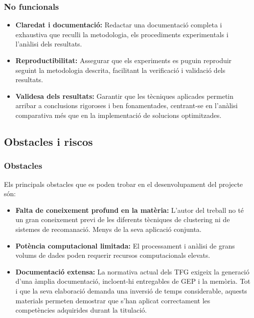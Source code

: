 \documentclass[a4paper,12pt]{report}
\begin{document}
\subsubsection{No funcionals}

\begin{itemize} 
    \item \textbf{Claredat i documentació:} Redactar una documentació completa i exhaustiva que reculli la metodologia, els procediments experimentals i l'anàlisi dels resultats.
    \item \textbf{Reproductibilitat:} Assegurar que els experiments es puguin reproduir seguint la metodologia descrita, facilitant la verificació i validació dels resultats.
    \item \textbf{Validesa dels resultats:} Garantir que les tècniques aplicades permetin arribar a conclusions rigoroses i ben fonamentades, centrant-se en l'anàlisi comparativa més que en la implementació de solucions optimitzades.
\end{itemize}

\subsection{Obstacles i riscos}

\subsubsection{Obstacles}

Els principals obstacles que es poden trobar en el desenvolupament del projecte són:

\begin{itemize}
    \item \textbf{Falta de coneixement profund en la matèria:} L'autor del treball no té un gran coneixement previ de les diferents tècniques de clustering ni de sistemes de recomanació. Menys de la seva aplicació conjunta.
    \item \textbf{Potència computacional limitada:} El processament i anàlisi de grans volums de dades poden requerir recursos computacionals elevats.
    \item \textbf{Documentació extensa:} La normativa actual dels TFG exigeix la generació d’una àmplia documentació, incloent-hi entregables de GEP i la memòria. Tot i que la seva elaboració demanda una inversió de temps considerable, aquests materials permeten demostrar que s’han aplicat correctament les competències adquirides durant la titulació.
\end{itemize}
\end{document}
